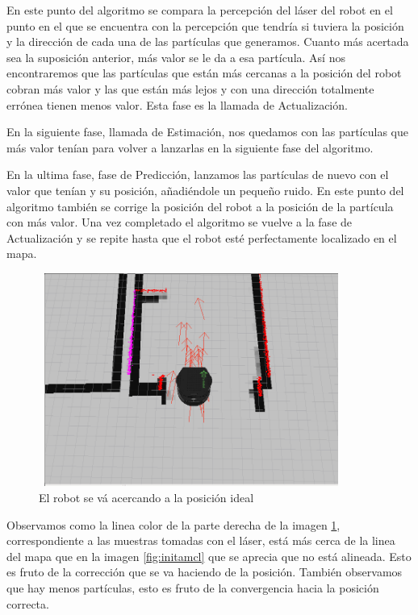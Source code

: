 En este punto del algoritmo se compara la percepción del láser del robot en el punto en el que se encuentra con la percepción que tendría si tuviera la posición y la dirección de cada una de las partículas que generamos. Cuanto más acertada sea la suposición anterior, más valor se le da a esa partícula. Así nos encontraremos que las partículas que están más cercanas a la posición del robot cobran más valor y las que están más lejos y con una dirección totalmente errónea tienen menos valor. Esta fase es la llamada de Actualización. 

En la siguiente fase, llamada de Estimación, nos quedamos con las partículas que más valor tenían para volver a lanzarlas en la siguiente fase del algoritmo.

En la ultima fase, fase de Predicción, lanzamos las partículas de nuevo con el valor que tenían y su posición, añadiéndole un pequeño ruido.
En este punto del algoritmo también se corrige la posición del robot a la posición de la partícula con más valor.
Una vez completado el algoritmo se vuelve a la fase de Actualización y se repite hasta que el robot esté perfectamente localizado en el 
mapa.

\begin{figure}[hbtp]
  \begin{center}
    \includegraphics[width=10cm,height=7cm]{img/cap5/actamcl}
  \end{center}
  \caption{El robot se vá acercando a la posición ideal}
  \label{fig:actamcl}
\end{figure}
\pagebreak

Observamos como la linea color de la parte derecha de la imagen \ref{fig:actamcl}, correspondiente a las muestras tomadas con el láser, está más cerca de la linea del mapa que en la imagen \ref{fig:initamcl} que se aprecia que no está alineada. Esto es fruto de la corrección que se va haciendo de la posición. También observamos que hay menos partículas, esto es fruto de la convergencia hacia la posición correcta.

